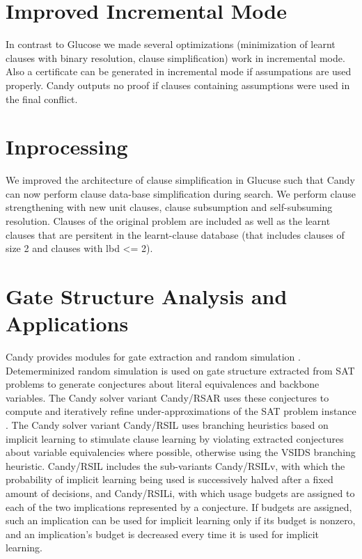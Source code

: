 \documentclass[conference]{IEEEtran}
\begin{document}
\section{Improved Incremental Mode}

In contrast to Glucose we made several optimizations (minimization of learnt clauses with binary resolution, clause simplification) work in incremental mode. Also a certificate can be generated in incremental mode if assumpations are used properly. Candy outputs no proof if clauses containing assumptions were used in the final conflict. 

\section{Inprocessing}

We improved the architecture of clause simplification in Glucuse such that Candy can now perform clause data-base simplification during search. We perform clause strengthening with new unit clauses, clause subsumption and self-subsuming resolution. Clauses of the original problem are included as well as the learnt clauses that are persitent in the learnt-clause database (that includes clauses of size 2 and clauses with lbd <= 2). 

\section{Gate Structure Analysis and Applications}

Candy provides modules for gate extraction \cite{Iser:2015:GateRecognition} and random simulation \cite{krohm1996use}.
Detemerminized random simulation is used on gate structure extracted from SAT problems to generate conjectures about literal equivalences and backbone variables.
The Candy solver variant Candy/RSAR uses these conjectures to compute and iteratively refine under-approximations of the SAT problem instance \cite{Kutzer:2016:Thesis}.
The Candy solver variant Candy/RSIL uses branching heuristics based on implicit learning \cite{Kutzer:2016:Thesis,DBLP:journals/jucs/LuWCMH04} to stimulate clause learning by violating extracted conjectures about variable equivalencies where possible, otherwise using the VSIDS branching heuristic.
Candy/RSIL includes the sub-variants Candy/RSILv, with which the probability of implicit learning being used is successively halved after a fixed amount of decisions, and Candy/RSILi, with which usage budgets are assigned to each of the two implications represented by a conjecture.
If budgets are assigned, such an implication can be used for implicit learning only if its budget is nonzero, and an implication's budget is decreased every time it is used for implicit learning.
\end{document}
